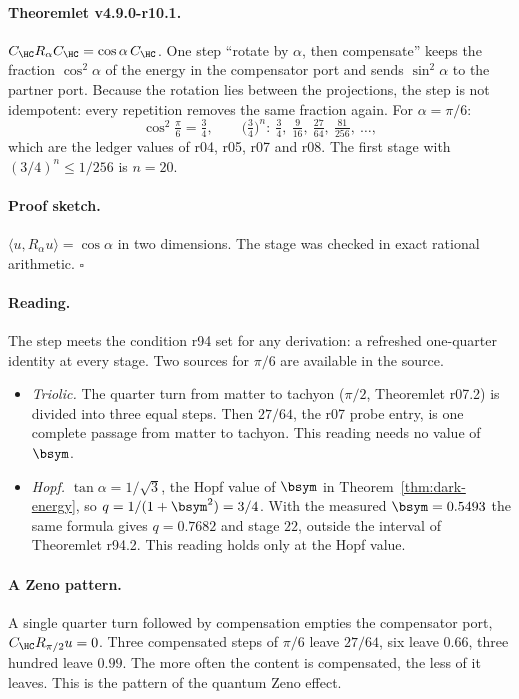 \paragraph{Theoremlet v4.9.0-r10.1.}
\(C_{\HC}R_\alpha C_{\HC}=\cos\alpha\,C_{\HC}\).  One step ``rotate by \(\alpha\), then compensate'' keeps the fraction
\(\cos^2\alpha\) of the energy in the compensator port and sends \(\sin^2\alpha\) to the partner port.  Because the rotation
lies between the projections, the step is not idempotent: every repetition removes the same fraction again.  For
\(\alpha=\pi/6\):
\[
\cos^2\tfrac\pi6=\tfrac34,\qquad
\bigl(\tfrac34\bigr)^n:\ \tfrac34,\ \tfrac9{16},\ \tfrac{27}{64},\ \tfrac{81}{256},\ \ldots,
\]
which are the ledger values of r04, r05, r07 and r08.  The first stage with \((3/4)^n\le1/256\) is \(n=20\).

\paragraph{Proof sketch.}
\(\langle u,R_\alpha u\rangle=\cos\alpha\) in two dimensions.  The stage was checked in exact rational arithmetic.
\(\square\)

\paragraph{Reading.}
The step meets the condition r94 set for any derivation: a refreshed one-quarter identity at every stage.  Two sources for
\(\pi/6\) are available in the source.
\begin{itemize}[leftmargin=2em]
\item \emph{Triolic.}  The quarter turn from matter to tachyon (\(\pi/2\), Theoremlet r07.2) is divided into three equal
steps.  Then \(27/64\), the r07 probe entry, is one complete passage from matter to tachyon.  This reading needs no value of
\(\bsym\).
\item \emph{Hopf.}  \(\tan\alpha=1/\sqrt3\), the Hopf value of \(\bsym\) in Theorem~\ref{thm:dark-energy}, so
\(q=1/(1+\bsym^2)=3/4\).  With the measured \(\bsym=0.5493\) the same formula gives \(q=0.7682\) and stage \(22\), outside the
interval of Theoremlet r94.2.  This reading holds only at the Hopf value.
\end{itemize}

\paragraph{A Zeno pattern.}
A single quarter turn followed by compensation empties the compensator port, \(C_{\HC}R_{\pi/2}u=0\).  Three compensated
steps of \(\pi/6\) leave \(27/64\), six leave \(0.66\), three hundred leave \(0.99\).  The more often the content is
compensated, the less of it leaves.  This is the pattern of the quantum Zeno effect.

